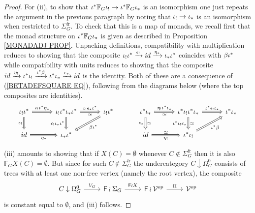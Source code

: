 \documentclass[a4paper,10pt]{article}%
\begin{document}
\begin{proof}
For (ii), to show that 
	$\iota^{\**} \mathbb{F}_G \iota_{!}
	\to	
	\iota^{\**} \mathbb{F}_G \iota_{\**}$ is an isomorphism one just repeats the argument in the previous paragraph by noting  that $\iota_! \to \iota_{\**}$ is an isomorphism when restricted to $\Sigma_G^{\text{fr}}$.
	To check that this is a map of monads, we recall first that the monad structure on $\iota^{\**} \mathbb{F}_G \iota_{\**}$
is given as described in Proposition \ref{MONADADJ PROP}.
Unpacking definitions, compatibility with multiplication reduces to showing that the composite 
$\iota_! \iota^{\**} \xrightarrow{\epsilon_!} 
id \xrightarrow{\eta_{\**}} \iota_{\**} \iota^{\**}$
coincides with $\beta \iota^{\**}$
while compatibility with units 
reduces to showing that the composite
$
	id \xrightarrow{\eta_!} 
	\iota^{\**} \iota_! \xrightarrow{\iota^{\**} \beta}
	\iota^{\**} \iota_{\**} \xrightarrow{\epsilon_{\**}}
	id
$
is the identity. Both of these are a consequence of 
(\ref{BETADEFSQUARE EQ}), following from the diagrams below 
(where the top composites are identities).
\begin{equation}
\begin{tikzcd}[column sep =3em]
		\iota_! \iota^{\**}
		\ar[Rightarrow]{r}{\iota_! \iota^{\**} \eta_{\**}}
		\ar[Rightarrow]{d}[swap]{\epsilon_!}
	&
		\iota_{!} \iota^{\**} \iota_{\**} \iota^{\**}
		\ar[Rightarrow]{d}[swap]{ \epsilon_! \iota_{\**}\iota^{\**}}
		\ar[Rightarrow]{r}[swap]{\simeq}{\iota_{!}\epsilon_{\**}\iota^{\**}}
	&
		\iota_! \iota^{\**}
		\ar[Rightarrow]{ld}{\beta \iota^{\**}}
	&	
		\iota^{\**} \iota_{\**}
		\ar[Rightarrow]{r}{\eta_! \iota^{\**} \iota_{\**}}[swap]{\simeq}
		\ar[Rightarrow]{d}[swap]{\epsilon_{\**}}{\simeq}
	&
		\iota^{\**} \iota_{!} \iota^{\**} \iota_{\**}
		\ar[Rightarrow]{r}{\iota^{\**} \epsilon_! \iota_{\**}}
		\ar[Rightarrow]{d}{\simeq}[swap]{\iota^{\**}\iota_{!}\epsilon_{\**}}
	&
		\iota^{\**}\iota_{\**}
\\
		id
		\ar[Rightarrow]{r}[swap]{\eta_{\**}}
	&
		\iota_{\**} \iota^{\**}
	&
	&	
		id
		\ar[Rightarrow]{r}[swap]{\eta_!}{\simeq}
	&
		\iota^{\**} \iota_!
		\ar[Rightarrow]{ru}[swap]{\iota^{\**} \beta}
\end{tikzcd}
\end{equation}

(iii) amounts to showing that if $X(C) =\emptyset$ whenever 
$C \nin \Sigma_G^{\text{fr}}$
then it is also 
$\mathbb{F}_G X(C) =\emptyset$.
But since for such 
$C \nin \Sigma_G^{\text{fr}}$
the undercategory
$C \downarrow \Omega_{G}^{0}$
consists of trees with at least one non-free vertex (namely the root vertex), the composite
\[
\begin{tikzcd}
	C \downarrow \Omega_{G}^{0} \ar{r}{V_G} &
	\Fin \wr \Sigma_G \ar{r}{\Fin \wr X} &
	\Fin \wr \mathcal{V}^{op} \ar{r}{\Pi}&
	\mathcal{V}^{op}
\end{tikzcd}
\]
is constant equal to $\emptyset$, and (iii) follows.


\end{proof}
\end{document}
